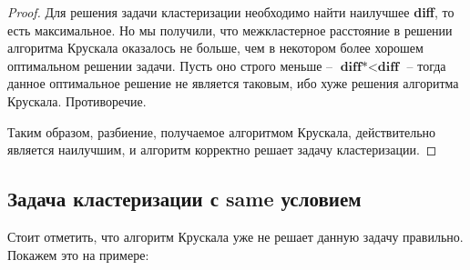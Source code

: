 \documentclass[a4paper,12pt]{article}
\begin{document}
\begin{proof}
Для решения задачи кластеризации необходимо найти наилучшее \textbf{diff}, то есть максимальное. Но мы получили, что межкластерное расстояние в решении алгоритма Крускала оказалось не больше, чем в некотором более хорошем оптимальном решении задачи. Пусть оно строго меньше -- $\textbf{diff*} < \textbf{diff}$ -- тогда данное оптимальное решение не является таковым, ибо хуже решения алгоритма Крускала. Противоречие.

Таким образом, разбиение, получаемое алгоритмом Крускала, действительно является наилучшим, и алгоритм корректно решает задачу кластеризации.

\end{proof}

\subsection{Задача кластеризации с same условием}

Стоит отметить, что алгоритм Крускала уже не решает данную задачу правильно. Покажем это на примере:
\end{document}
